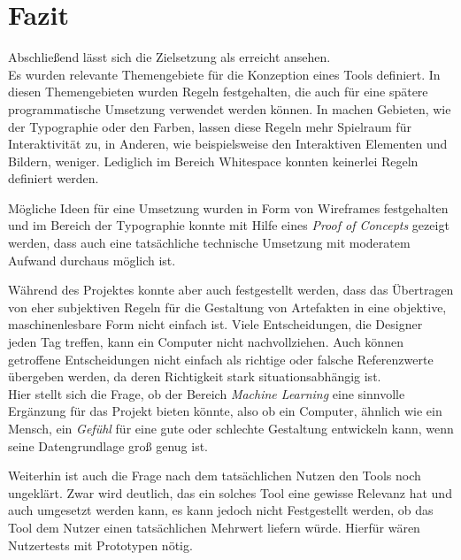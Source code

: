 
\chapter{Fazit} %

\label{Fazit} %


Abschließend lässt sich die Zielsetzung als erreicht ansehen. \\
Es wurden relevante Themengebiete für die Konzeption eines Tools definiert. In diesen Themengebieten wurden Regeln festgehalten, die auch für eine spätere programmatische Umsetzung verwendet werden können. In machen Gebieten, wie der Typographie oder den Farben, lassen diese Regeln mehr Spielraum für Interaktivität zu, in Anderen, wie beispielsweise den Interaktiven Elementen und Bildern, weniger. Lediglich im Bereich Whitespace konnten keinerlei Regeln definiert werden.

Mögliche Ideen für eine Umsetzung wurden in Form von Wireframes festgehalten und im Bereich der Typographie konnte mit Hilfe eines \textit{Proof of Concepts} gezeigt werden, dass auch eine tatsächliche technische Umsetzung mit moderatem Aufwand durchaus möglich ist.

Während des Projektes konnte aber auch festgestellt werden, dass das Übertragen von eher subjektiven Regeln für die Gestaltung von Artefakten in eine objektive, maschinenlesbare Form nicht einfach ist. Viele Entscheidungen, die Designer jeden Tag treffen, kann ein Computer nicht nachvollziehen. Auch können getroffene Entscheidungen nicht einfach als richtige oder falsche Referenzwerte übergeben werden, da deren Richtigkeit stark situationsabhängig ist. \\
Hier stellt sich die Frage, ob der Bereich \textit{Machine Learning} eine sinnvolle Ergänzung für das Projekt bieten könnte, also ob ein Computer, ähnlich wie ein Mensch, ein \textit{Gefühl} für eine gute oder schlechte Gestaltung entwickeln kann, wenn seine Datengrundlage groß genug ist.

Weiterhin ist auch die Frage nach dem tatsächlichen Nutzen den Tools noch ungeklärt. Zwar wird deutlich, das ein solches Tool eine gewisse Relevanz hat und auch umgesetzt werden kann, es kann jedoch nicht Festgestellt werden, ob das Tool dem Nutzer einen tatsächlichen Mehrwert liefern würde. Hierfür wären Nutzertests mit Prototypen nötig. 


\clearpage